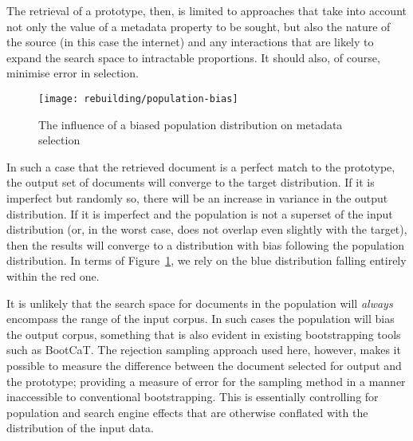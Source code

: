 The retrieval of a prototype, then, is limited to approaches that take into account not only the value of a metadata property to be sought, but also the nature of the source (in this case the internet) and any interactions that are likely to expand the search space to intractable proportions.  It should also, of course, minimise error in selection.


\begin{figure}[h]
    \centering
    \texttt{[image: rebuilding/population-bias]}
    \caption{The influence of a biased population distribution on metadata selection}
    \label{fig:rebuilding:population-bias}
\end{figure}


In such a case that the retrieved document is a perfect match to the prototype, the output set of documents will converge to the target distribution.  If it is imperfect but randomly so, there will be an increase in variance in the output distribution.  If it is imperfect and the population is not a superset of the input distribution (or, in the worst case, does not overlap even slightly with the target), then the results will converge to a distribution with bias following the population distribution.  In terms of Figure~\ref{fig:rebuilding:population-bias}, we rely on the blue distribution falling entirely within the red one.


It is unlikely that the search space for documents in the population will \textsl{always} encompass the range of the input corpus.  In such cases the population will bias the output corpus, something that is also evident in existing bootstrapping tools such as BootCaT\cite{baroni2004bootcat}.  The rejection sampling approach used here, however, makes it possible to measure the difference between the document selected for output and the prototype; providing a measure of error for the sampling method in a manner inaccessible to conventional bootstrapping.  This is essentially controlling for population and search engine effects that are otherwise conflated with the distribution of the input data.


